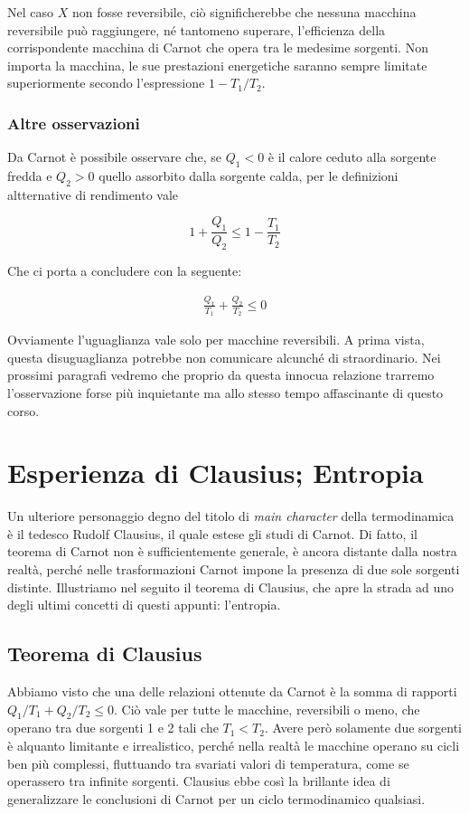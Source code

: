 Nel caso $X$ non fosse reversibile, ciò significherebbe che
nessuna macchina reversibile può raggiungere, né tantomeno
superare, l'efficienza della corrispondente macchina di Carnot
che opera tra le medesime sorgenti. Non importa la macchina,
le sue prestazioni energetiche saranno sempre limitate superiormente
secondo l'espressione $1 - T_1/T_2$.

\subsubsection*{Altre osservazioni}
Da Carnot è possibile osservare che, se $Q_1 < 0$ è il calore ceduto
alla sorgente fredda e $Q_2 > 0$ quello assorbito dalla sorgente
calda, per le definizioni altternative di rendimento vale

\[ 1 + \frac{Q_1}{Q_2} \leq 1 - \frac{T_1}{T_2} \]

\noindent Che ci porta a concludere con la seguente:

\begin{align}
    \frac{Q_1}{T_1} + \frac{Q_2}{T_2} \leq 0
\end{align}

Ovviamente l'uguaglianza vale solo per macchine reversibili.
A prima vista, questa disuguaglianza potrebbe non comunicare
alcunché di straordinario. Nei prossimi paragrafi vedremo che
proprio da questa innocua relazione trarremo l'osservazione
forse più inquietante ma allo stesso tempo affascinante di
questo corso.

\section{Esperienza di Clausius; Entropia}
Un ulteriore personaggio degno del titolo di \textit{main character}
della termodinamica è il tedesco Rudolf Clausius, il quale estese
gli studi di Carnot. Di fatto, il teorema di Carnot non è sufficientemente
generale, è ancora distante dalla nostra realtà, perché nelle trasformazioni
Carnot impone la presenza di due sole sorgenti distinte. Illustriamo nel seguito
il teorema di Clausius, che apre la strada ad uno degli ultimi concetti di questi
appunti: l'entropia.

\subsection{Teorema di Clausius}
Abbiamo visto che una delle relazioni ottenute da Carnot è la
somma di rapporti $Q_1/T_1 + Q_2/T_2 \leq 0$. Ciò vale per tutte
le macchine, reversibili o meno, che operano tra due sorgenti 1
e 2 tali che $T_1 < T_2$. Avere però solamente due sorgenti è
alquanto limitante e irrealistico, perché nella realtà le macchine
operano su cicli ben più complessi, fluttuando tra svariati valori
di temperatura, come se operassero tra infinite sorgenti. Clausius
ebbe così la brillante idea di generalizzare le conclusioni di
Carnot per un ciclo termodinamico qualsiasi.

